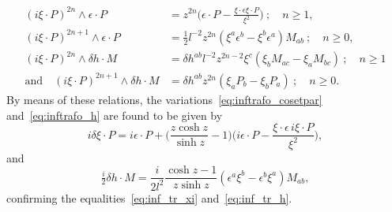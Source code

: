 \documentclass[11pt]{article}
\begin{document}
\begin{align*}
	(i\xi\cdot P)^{2n} \wedge \epsilon\cdot P &= z^{2n} 
	\bigg(\epsilon\cdot P - \frac{\xi\cdot\epsilon \xi\cdot 
		P}{\xi^2} \bigg)~;\quad n \geqslant 1,
	\\
	(i\xi\cdot P)^{2n+1} \wedge \epsilon\cdot P &= 
	\tfrac{1}{2}l^{-2}z^{2n} (\xi^a\epsilon^b - \xi^b\epsilon^a) 
	M_{ab}~;\quad n \geqslant 0,
	\\
	(i\xi\cdot P)^{2n} \wedge \delta h \cdot M &= \delta h^{ab} 
	l^{-2}z^{2n-2} \xi^c(\xi_b M_{ac} - \xi_a M_{bc})~;\quad n 
	\geqslant 1
	\\
	\text{and}\quad
	(i\xi\cdot P)^{2n+1} \wedge \delta h \cdot M &= \delta h^{ab} 
	z^{2n} (\xi_a P_b - \xi_b P_a)~;\quad n \geqslant 0.
\end{align*}
By means of these relations, the 
variations~\eqref{eq:inftrafo_cosetpar} and~\eqref{eq:inftrafo_h} 
are found to be given by
\begin{displaymath}
	i\delta\xi \cdot P = i\epsilon\cdot P + \bigg(\frac{z\cosh 
		z}{\sinh z} - 1\bigg) \bigg(i\epsilon\cdot P - 
	\frac{\xi\cdot\epsilon \, i\xi\cdot P}{\xi^2}\bigg),
\end{displaymath}
and
\begin{displaymath}
	\tfrac{i}{2}\delta h \cdot M = \frac{i}{2l^2} \frac{\cosh z - 
		1}{z\sinh z} (\epsilon^a\xi^b - \epsilon^b\xi^a) M_{ab},
\end{displaymath}
confirming the equalities~\eqref{eq:inf_tr_xi} 
and~\eqref{eq:inf_tr_h}.
\end{document}
